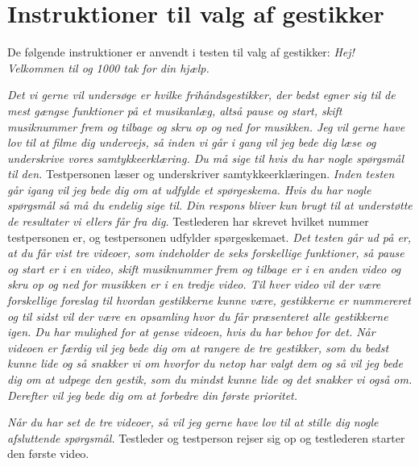 \chapter{Instruktioner til valg af gestikker}
\label{app:InstruktionerValgAfGestikker}
%
De følgende instruktioner er anvendt i testen til valg af gestikker:\blankline
%
\textit{Hej! Velkommen til og 1000 tak for din hjælp.} 

\textit{Det vi gerne vil undersøge er hvilke frihåndsgestikker, der bedst egner sig til de mest gængse funktioner på et musikanlæg, altså pause og start, skift musiknummer frem og tilbage og skru op og ned for musikken. Jeg vil gerne have lov til at filme dig undervejs, så inden vi går i gang vil jeg bede dig læse og underskrive vores samtykkeerklæring. Du må sige til hvis du har nogle spørgsmål til den.}\blankline
%
Testpersonen læser og underskriver samtykkeerklæringen. \blankline
%  
\textit{Inden testen går igang vil jeg bede dig om at udfylde et spørgeskema. Hvis du har nogle spørgsmål så må du endelig sige til. Din respons bliver kun brugt til at understøtte de resultater vi ellers får fra dig.} \blankline
%
Testlederen har skrevet hvilket nummer testpersonen er, og testpersonen udfylder spørgeskemaet.\blankline
%  
\textit{Det testen går ud på er, at du får vist tre videoer, som indeholder de seks forskellige funktioner, så pause og start er i en video, skift musiknummer frem og tilbage er i en anden video og skru op og ned for musikken er i en tredje video. Til hver video vil der være forskellige foreslag til hvordan gestikkerne kunne være, gestikkerne er nummereret og til sidst vil der være en opsamling hvor du får præsenteret alle gestikkerne igen. Du har mulighed for at gense videoen, hvis du har behov for det. Når videoen er færdig vil jeg bede dig om at rangere de tre gestikker, som du bedst kunne lide og så snakker vi om hvorfor du netop har valgt dem og så vil jeg bede dig om at udpege den gestik, som du mindst kunne lide og det snakker vi også om. Derefter vil jeg bede dig om at forbedre din første prioritet.} 

\textit{Når du har set de tre videoer, så vil jeg gerne have lov til at stille dig nogle afsluttende spørgsmål.}\blankline
%
Testleder og testperson rejser sig op og testlederen starter den første video. 
% 
